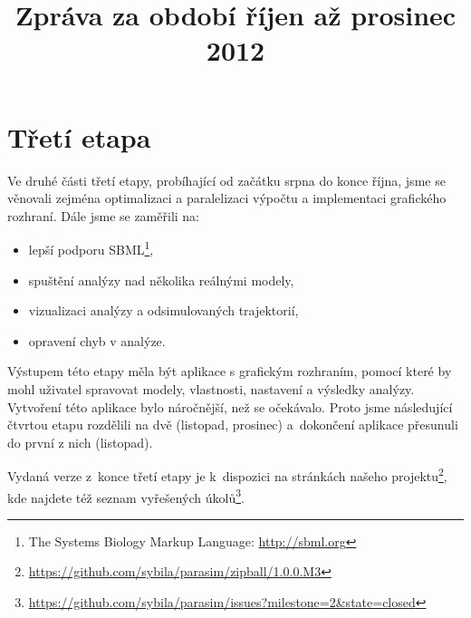 \documentclass{parasim}
\title{Zpráva za období říjen až prosinec 2012}
\begin{document}
\section{Třetí etapa}

Ve druhé části třetí etapy, probíhající od začátku srpna do konce října, jsme se věnovali zejména
optimalizaci a paralelizaci výpočtu a implementaci grafického rozhraní. Dále jsme se zaměřili na:

\begin{itemize}
	\item	lepší podporu SBML\footnote{The Systems Biology Markup Language: \url{http://sbml.org}},
	\item	spuštění analýzy nad několika reálnými modely,
	\item	vizualizaci analýzy a odsimulovaných trajektorií,
	\item	opravení chyb v analýze.
\end{itemize}

Výstupem této etapy měla být aplikace s grafickým rozhraním, pomocí které by mohl uživatel spravovat modely,
vlastnosti, nastavení a výsledky analýzy. Vytvoření této aplikace bylo náročnější, než se očekávalo.
Proto jsme následující čtvrtou etapu rozdělili na dvě (listopad, prosinec) a~do\-končení aplikace přesunuli
do první z nich (listopad). 

Vydaná verze z~konce třetí etapy je k~dispozici na stránkách našeho projektu\footnote{\url{https://github.com/sybila/parasim/zipball/1.0.0.M3}},
kde najdete též seznam vyřešených úkolů\footnote{\url{https://github.com/sybila/parasim/issues?milestone=2&state=closed}}.
\end{document}
